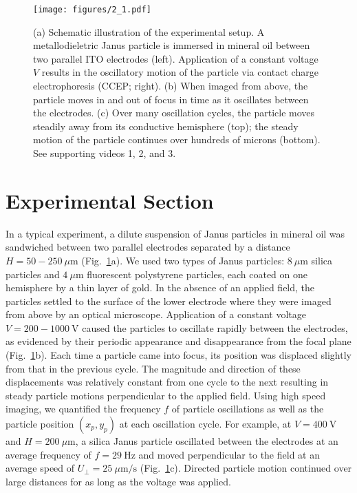 \begin{figure}[p]
\centering
\texttt{[image: figures/2\_1.pdf]}
\caption{ (a) Schematic illustration of the experimental setup. A metallodieletric Janus particle is immersed in mineral oil between two parallel ITO electrodes (left).  Application of a constant voltage $V$ results in the oscillatory motion of the particle via contact charge electrophoresis (CCEP; right). (b) When imaged from above, the particle moves in and out of focus in time as it oscillates between the electrodes. (c) Over many oscillation cycles, the particle moves steadily away from its conductive hemisphere (top); the steady motion of the particle continues over hundreds of microns (bottom).  See supporting videos 1, 2, and 3.}
\label{fig:2.1}
\end{figure}
 
 
\section{Experimental Section}

In a typical experiment, a dilute suspension of Janus particles in mineral oil was sandwiched between two parallel  electrodes separated by a distance $H= 50 - 250~\mu\text{m}$ (Fig.~\ref{fig:2.1}a). 
We used two types of Janus particles: $8~\mu\text{m}$ silica particles and $4~\mu\text{m}$ fluorescent polystyrene particles, each coated on one hemisphere by a thin layer of gold.
In the absence of an applied field, the particles settled to the surface of the lower electrode where they were imaged from above by an optical microscope.
Application of a constant voltage $V = 200 - 1000~\text{V}$ caused the particles to oscillate rapidly between the electrodes, as evidenced by their periodic appearance and disappearance from the focal plane (Fig.~\ref{fig:2.1}b). 
Each time a particle came into focus, its position was displaced slightly from that in the previous cycle.
The magnitude and direction of these displacements was relatively constant from one cycle to the next resulting in steady particle motions perpendicular to the applied field.
Using high speed imaging, we quantified the frequency $f$ of particle oscillations as well as the particle position $(x_p,y_p)$ at each oscillation cycle.
For example, at $V = 400~\text{V}$ and $H=200~\mu\text{m}$, a silica Janus particle oscillated between the electrodes at an average frequency of $f = 29~\text{Hz}$ and moved perpendicular to the field at an average speed of $U_{\perp} = 25~\mu\text{m/s}$ (Fig.~\ref{fig:2.1}c).
Directed particle motion continued over large distances for as long as the voltage was applied.

